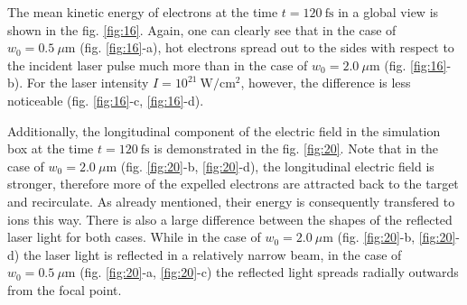 The mean kinetic energy of electrons at the time $ t = 120 \ \mathrm{fs} $ in a global view is shown in the fig. \ref{fig:16}. Again, one can clearly see that in the case of $ w_0 = 0.5 \ \mu\mathrm{m} $ (fig. \ref{fig:16}-a), hot electrons spread out to the sides with respect to the incident laser pulse much more than in the case of $ w_0 = 2.0 \ \mu\mathrm{m} $ (fig. \ref{fig:16}-b). For the laser intensity $ I = 10^{21} \ \mathrm{W/cm^2} $, however, the difference is less noticeable (fig. \ref{fig:16}-c, \ref{fig:16}-d).

Additionally, the longitudinal component of the electric field in the simulation box at the time $ t = 120 \ \mathrm{fs} $ is demonstrated in the fig. \ref{fig:20}. Note that in the case of $ w_0 = 2.0 \ \mu\mathrm{m} $ (fig. \ref{fig:20}-b, \ref{fig:20}-d), the longitudinal electric field is stronger, therefore more of the expelled electrons are attracted back to the target and recirculate. As already mentioned, their energy is consequently transfered to ions this way. There is also a large difference between the shapes of the reflected laser light for both cases. While in the case of $ w_0 = 2.0 \ \mu\mathrm{m} $ (fig. \ref{fig:20}-b, \ref{fig:20}-d) the laser light is reflected in a relatively narrow beam, in the case of $ w_0 = 0.5 \ \mu\mathrm{m} $ (fig. \ref{fig:20}-a, \ref{fig:20}-c) the reflected light spreads radially outwards from the focal point.

